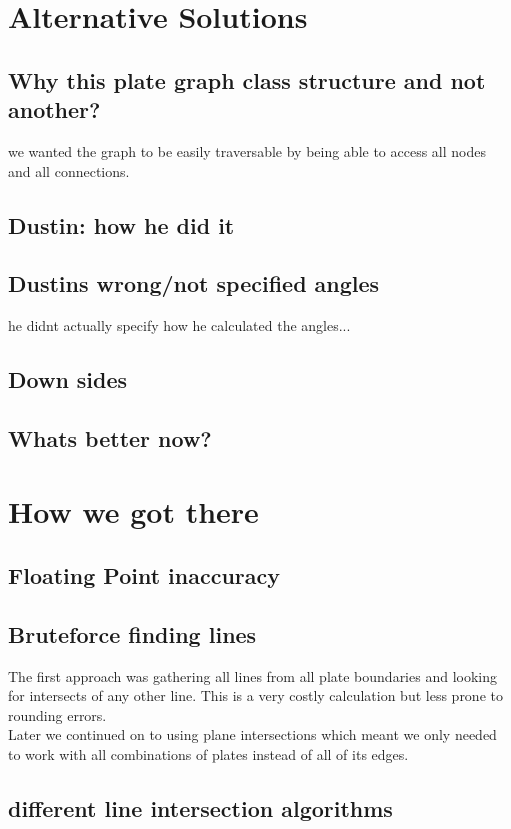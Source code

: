 \documentclass[../ClassicThesis.tex]{subfiles}
\begin{document}
\section{Alternative Solutions}
\subsection{Why this plate graph class structure and not another?}
we wanted the graph to be easily traversable by being able to access all nodes and all connections.\\

\subsection{Dustin: how he did it}
\subsection{Dustins wrong/not specified angles}
he didnt actually specify how he calculated the angles...
\subsection{Down sides}
\subsection{Whats better now?}

\section{How we got there}
\subsection{Floating Point inaccuracy}
\subsection{Bruteforce finding lines}
The first approach was gathering all lines from all plate boundaries and looking for intersects of any other line. This is a very costly calculation but less prone to rounding errors. \\
Later we continued on to using plane intersections which meant we only needed to work with all combinations of plates instead of all of its edges.
\subsection{different line intersection algorithms}
\end{document}
